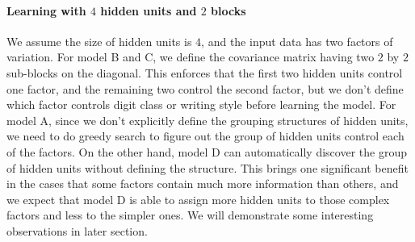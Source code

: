\paragraph{Learning with $4$ hidden units and $2$ blocks}
We assume the size of hidden units is $4$, and the input data has two factors of variation. For model B and C, we define the covariance matrix having two $2$ by $2$ sub-blocks on the diagonal. This enforces that the first two hidden units control one factor, and the remaining two control the second factor, but we don't define which factor controls digit class or writing style before learning the model. For model A, since we don't explicitly define the grouping structures of hidden units, we need to do greedy search to figure out the group of hidden units control each of the factors. On the other hand, model D can automatically discover the group of hidden units without defining the structure. This brings one significant benefit in the cases that some factors contain much more information than others, and we expect that model D is able to assign more hidden units to those complex factors and less to the simpler ones. We will demonstrate some interesting observations in later section.


